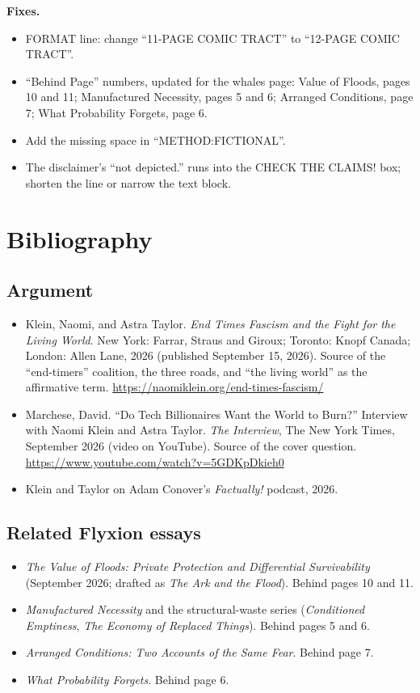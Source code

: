 \documentclass[11pt]{article}
\begin{document}
\textbf{Fixes.}
\begin{itemize}
\item \textsf{FORMAT} line: change ``11-PAGE COMIC TRACT'' to ``12-PAGE COMIC TRACT''.
\item ``Behind Page'' numbers, updated for the whales page: Value of Floods, pages 10 and 11; Manufactured Necessity, pages 5 and 6; Arranged Conditions, page 7; What Probability Forgets, page 6.
\item Add the missing space in ``METHOD:FICTIONAL''.
\item The disclaimer's ``not depicted.'' runs into the \textsf{CHECK THE CLAIMS!} box; shorten the line or narrow the text block.
\end{itemize}

\section{Bibliography}

\subsection{Argument}
\begin{itemize}
\item Klein, Naomi, and Astra Taylor. \emph{End Times Fascism and the Fight for the Living World}. New York: Farrar, Straus and Giroux; Toronto: Knopf Canada; London: Allen Lane, 2026 (published September 15, 2026). Source of the ``end-timers'' coalition, the three roads, and ``the living world'' as the affirmative term. \url{https://naomiklein.org/end-times-fascism/}
\item Marchese, David. ``Do Tech Billionaires Want the World to Burn?'' Interview with Naomi Klein and Astra Taylor. \emph{The Interview}, The New York Times, September 2026 (video on YouTube). Source of the cover question. \url{https://www.youtube.com/watch?v=5GDKpDkieh0}
\item Klein and Taylor on Adam Conover's \emph{Factually!} podcast, 2026.
\end{itemize}

\subsection{Related Flyxion essays}
\begin{itemize}
\item \emph{The Value of Floods: Private Protection and Differential Survivability} (September 2026; drafted as \emph{The Ark and the Flood}). Behind pages 10 and 11.
\item \emph{Manufactured Necessity} and the structural-waste series (\emph{Conditioned Emptiness}, \emph{The Economy of Replaced Things}). Behind pages 5 and 6.
\item \emph{Arranged Conditions: Two Accounts of the Same Fear}. Behind page 7.
\item \emph{What Probability Forgets}. Behind page 6.
\end{itemize}
\end{document}
